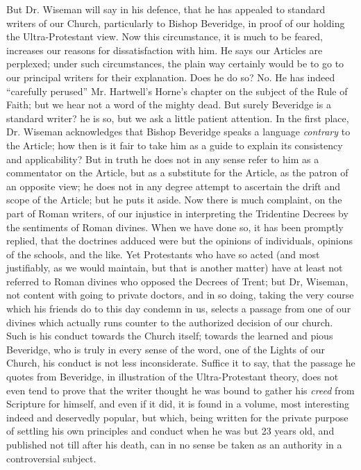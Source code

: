 But Dr.
Wiseman will say in his defence, that he has appealed to standard
writers of our Church, particularly to Bishop Beveridge, in proof of our
holding the Ultra-Protestant view. Now this circumstance, it is much to
be feared, increases our reasons for dissatisfaction with him. He says
our Articles are perplexed; under such circumstances, the plain way
certainly would be to go to our principal writers for their explanation.
Does he do so? No. He has indeed ``carefully perused'' Mr.
Hartwell's Horne's chapter on the subject of the Rule of Faith; but
we hear not a word of the mighty dead. But surely Beveridge is a
standard writer? he is so, but we ask a little patient attention. In the
first place, Dr. Wiseman acknowledges that Bishop Beveridge speaks a
language \emph{contrary} to the Article; how then is
it fair to take him as a guide to explain its consistency and
applicability? But in truth he does not in any sense refer to him as a
commentator on the Article, but as a substitute for the Article, as the
patron of an opposite view; he does not in any degree attempt to
ascertain the drift and scope of the Article; but he puts it aside. Now
there is much complaint, on the part of Roman writers, of our injustice
in interpreting the Tridentine Decrees by the sentiments of Roman
divines. When we have done so, it has been promptly replied, that the
doctrines adduced were but the opinions of individuals, opinions of the
schools, and the like. Yet Protestants who have so acted (and most
justifiably, as we would maintain, but that is another matter) have at
least not referred to Roman divines who opposed the Decrees of Trent;
but Dr, Wiseman, not content with going to private doctors, and in so
doing, taking the very course which his friends do to this day condemn
in us, selects a passage from one of our divines which actually runs
counter to the authorized decision of our church. Such is his conduct
towards the Church itself; towards the learned and pious Beveridge, who
is truly in every sense of the word, one of the Lights of our Church,
his conduct is not less inconsiderate. Suffice it to say, that the
passage he quotes from Beveridge, in illustration of the
Ultra-Protestant theory, does not even tend to prove that the writer
thought he was bound to gather his \emph{creed} from Scripture for
himself, and even if it did, it is found in a volume, most interesting
indeed and deservedly popular, but which, being written for the private
purpose of settling his own principles and conduct when he was but 23
years old, and published not till after his death, can in no sense be
taken as an authority in a controversial subject.

